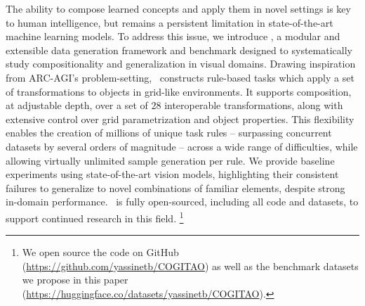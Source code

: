 %
The ability to compose learned concepts and apply them in novel settings is key to human intelligence, but remains a persistent limitation in state-of-the-art machine learning models.
%
To address this issue, we introduce \generatorName, a modular and extensible data generation framework and benchmark designed to systematically study compositionality and generalization in visual domains. 
%
Drawing inspiration from ARC-AGI's problem-setting, \generatorName\ constructs rule-based tasks which apply a set of transformations to objects in grid-like environments. 
%
It supports composition, at adjustable depth, over a set of $28$ interoperable transformations, along with extensive control over grid parametrization and object properties. 
%
This flexibility enables the creation of millions of unique task rules -- surpassing concurrent datasets by several orders of magnitude -- across a wide range of difficulties, while allowing virtually unlimited sample generation per rule.
%
%
We provide baseline experiments using state-of-the-art vision models, highlighting their consistent failures to generalize to novel combinations of familiar elements, despite strong in-domain performance. 
%
\generatorName\ is fully open-sourced, including all code and datasets, to support continued research in this field. \footnote{We open source the code on GitHub (\url{https://github.com/yassinetb/COGITAO}) as well as the benchmark datasets we propose in this paper (\url{https://huggingface.co/datasets/yassinetb/COGITAO}).}